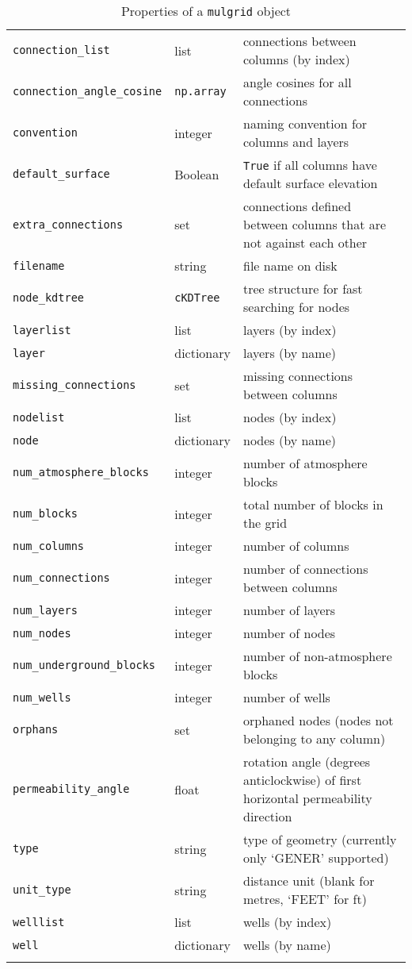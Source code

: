 \begin{center}
\begin{longtable}{|l|l|p{75mm}|}
    \texttt{connection\_list} & list & connections between columns (by index)\\
    \texttt{connection\_angle\_cosine} & \texttt{np.array} & angle cosines for all connections\\
    \texttt{convention} & integer & naming convention for columns and layers\\
    \texttt{default\_surface} & Boolean  & \texttt{True} if all columns have default surface elevation\\
    \texttt{extra\_connections} & set & connections defined between columns that are not against each other\\
    \texttt{filename} & string  & file name on disk\\
    \texttt{node\_kdtree} & \texttt{cKDTree} & tree structure for fast searching for nodes \\
    \texttt{layerlist} & list & layers (by index)\\
    \texttt{layer} & dictionary & layers (by name)\\
    \texttt{missing\_connections} & set & missing connections between columns\\
    \texttt{nodelist} & list  & nodes (by index)\\
    \texttt{node} & dictionary  & nodes (by name)\\
    \texttt{num\_atmosphere\_blocks} & integer & number of atmosphere blocks\\
    \texttt{num\_blocks} & integer & total number of blocks in the grid\\
    \texttt{num\_columns} & integer & number of columns\\
    \texttt{num\_connections} & integer & number of connections between columns\\
    \texttt{num\_layers} & integer & number of layers\\
    \texttt{num\_nodes} & integer & number of nodes\\
    \texttt{num\_underground\_blocks} & integer & number of non-atmosphere blocks\\
    \texttt{num\_wells} & integer & number of wells\\
    \texttt{orphans} & set & orphaned nodes (nodes not belonging to any column)\\
    \texttt{permeability\_angle} & float & rotation angle (degrees anticlockwise) of first horizontal permeability direction \\
    \texttt{type} & string  & type of geometry (currently only `GENER' supported)\\
    \texttt{unit\_type} & string & distance unit (blank for metres, `FEET' for ft)\\
    \texttt{welllist} & list & wells (by index)\\
    \texttt{well} & dictionary & wells (by name)\\
    \hline
    \caption{Properties of a \texttt{mulgrid} object}
    \label{tb:mulgrid_properties}
  \end{longtable}
\end{center}


